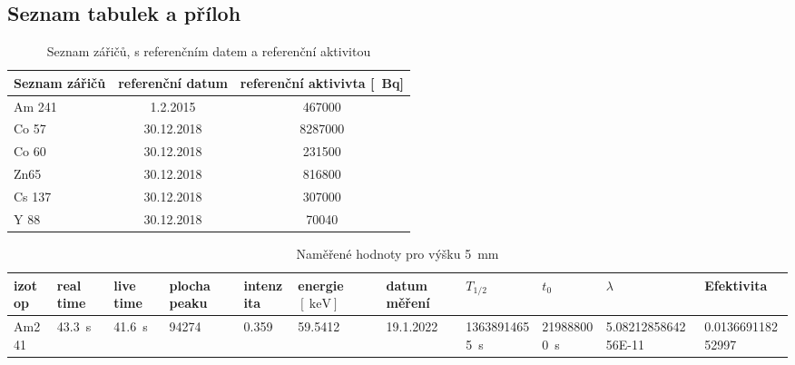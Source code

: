 \documentclass[12pt,a4paper]{article}
\begin{document}
\begin{spacing}{1.5}
\section*{Seznam tabulek a příloh}
\begin{table}[h!]
	\caption{Seznam zářičů, s referenčním datem a referenční aktivitou}
	\vspace*{2mm}
	\centering
	\begin{tabular}{l|c|c}
		\hline
		Seznam zářičů & referenční datum & referenční aktivivta {[\SI{}{\becquerel}]} \\ \hline
		Am 241        & 1.2.2015         & \num{467000}                        \\ \hline
		Co 57         & 30.12.2018       & \num{8287000}                       \\ \hline
		Co 60         & 30.12.2018       & \num{231500}                        \\ \hline
		Zn65          & 30.12.2018       & \num{816800}                        \\ \hline
		Cs 137        & 30.12.2018       & \num{307000}                        \\ \hline
		Y 88          & 30.12.2018       & \num{70040}                        
	\end{tabular}
\end{table}
\begin{landscape}
\begin{table}[]
	\caption{Naměřené hodnoty pro výšku \SI{5}{\milli\meter}}
	\vspace*{2mm}
	\hspace*{-2cm}
\begin{tabular}{l|l|l|l|l|l|l|l|l|l|l}\hline
	izotop                & real time                			   & live time                				& plocha peaku 		 & intenzita	   & energie $ [\SI{}{\kilo\electronvolt}] $& datum měření                & $ T_{1/2}  $                 			    & $t_0$                        			  & $\lambda$                                		& Efektivita                \\ \hline
Am241                 & \SI{43.3}{\second}                     & \SI{41.6}{\second}                     & \num{94274}        & \num{0.359}     & \num{59.5412}      				  & 19.1.2022                   & \SI{13638914655}{\second}                & \SI{219888000}{\second}                 & \num{5.0821285864256E-11}                   & \num{0.013669118252997}  \\ \hline

\end{tabular}
\end{table}
\end{landscape}
\end{spacing}
\end{document}
